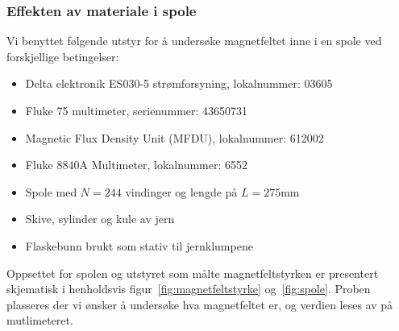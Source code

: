 \documentclass[a4paper,11pt, twocolumn]{article}
\begin{document}
\subsubsection{Effekten av materiale i spole}
Vi benyttet følgende utstyr for å undersøke magnetfeltet inne i en spole ved forskjellige betingelser:
\begin{itemize}
	\item Delta elektronik ES030-5 strømforsyning, lokalnummer: 03605
	\item Fluke 75 multimeter, serienummer: 43650731
	\item Magnetic Flux Density Unit (MFDU), lokalnummer: 612002
	\item Fluke 8840A Multimeter, lokalnummer: 6552
	\item Spole med $N=244$ vindinger og lengde på $L=275$mm
	\item Skive, sylinder og kule av jern
	\item Flaskebunn brukt som stativ til jernklumpene
\end{itemize}
Oppsettet for spolen og utstyret som målte magnetfeltstyrken er presentert skjematisk i henholdsvis figur~\ref{fig:magnetfeltstyrke} og~\ref{fig:spole}. Proben plasseres der vi ønsker å undersøke hva magnetfeltet er, og verdien leses av på mutlimeteret.
\end{document}
